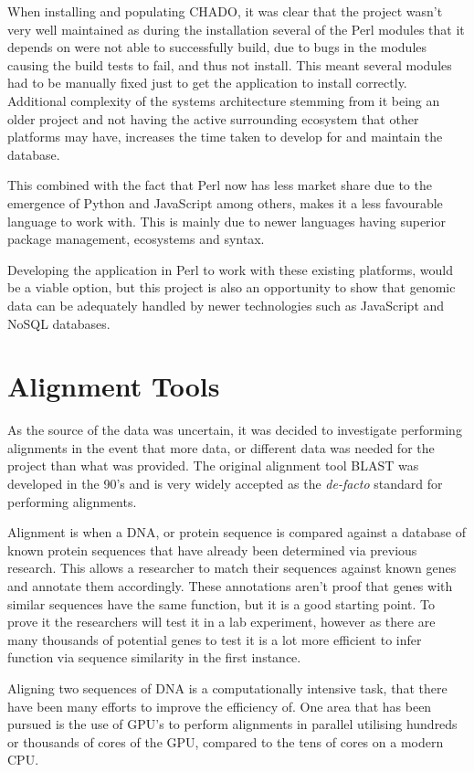 When installing and populating CHADO, it was clear that the project wasn't very well maintained as during the installation several of the Perl modules that it depends on were not able to successfully build, due to bugs in the modules causing the build tests to fail, and thus not install. This meant several modules had to be manually fixed just to get the application to install correctly. Additional complexity of the systems architecture stemming from it being an older project and not having the active surrounding ecosystem that other platforms may have, increases the time taken to develop for and maintain the database.

This combined with the fact that Perl now has less market share due to the emergence of Python\cite{python} and JavaScript\cite{node} among others, makes it a less favourable language to work with. This is mainly due to newer languages having superior package management, ecosystems and syntax. 

Developing the application in Perl to work with these existing platforms, would be a viable option, but this project is also an opportunity to show that genomic data can be adequately handled by newer technologies such as JavaScript and NoSQL databases.

\section{Alignment Tools}
As the source of the data was uncertain, it was decided to investigate performing alignments in the event that more data, or different data was needed for the project than what was provided. The original alignment tool BLAST\cite{blast} was developed in the 90's and is very widely accepted as the {\it de-facto} standard for performing alignments. 

Alignment is when a DNA, or protein sequence is compared against a database of known protein sequences that have already been determined via previous research. This allows a researcher to match their sequences against known genes and annotate them accordingly. These annotations aren't proof that genes with similar sequences have the same function, but it is a good starting point. To prove it the researchers will test it in a lab experiment, however as there are many thousands of potential genes to test it is a lot more efficient to infer function via sequence similarity in the first instance.

Aligning two sequences of DNA is a computationally intensive task, that there have been many efforts to improve the efficiency of. One area that has been pursued is the use of GPU's to perform alignments in parallel utilising hundreds or thousands of cores of the GPU, compared to the tens of cores on a modern CPU. 

